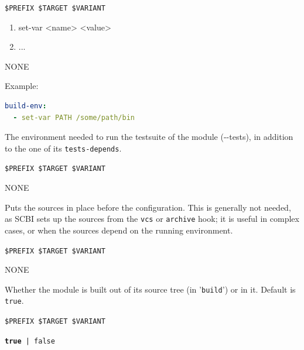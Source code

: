 \documentclass[a4paper,12pt,twoside]{article}
\newcommand{\code}[1]{\texttt{#1}}
\newcommand{\file}[1]{'{\texttt{#1}}'}
\newcommand{\ddash}{-{}-}
\begin{document}
\begin{description}[font=\large\texttt]
	\begin{description}[font=\textit,style=standard]
		\item[parameter] \tabto{2cm} \code{\$PREFIX \$TARGET \$VARIANT}
		\begin{enumerate}
			\item set-var <name> <value>
			\item ...
		\end{enumerate}
		\item[return] \tabto{2cm} NONE
	\end{description}

	Example:
\begin{lstlisting}[language={yaml}]
build-env:
  - set-var PATH /some/path/bin
\end{lstlisting}

	\item[tests-env {[}common|<variant>{]}] The environment needed to run the testsuite of the module (\ddash{}tests), in addition to the one of its \code{tests-depends}.
	\begin{description}[font=\textit,style=standard]
		\item[parameter] \tabto{2cm} \code{\$PREFIX \$TARGET \$VARIANT}
		\item[return] \tabto{2cm} NONE
	\end{description}

	\item[setup {[}<variant>{]}] Puts the sources in place before the configuration. This is generally not needed, as SCBI sets up the sources from the \code{vcs} or \code{archive} hook; it is useful in complex cases, or when the sources depend on the running environment.
	\begin{description}[font=\textit,style=standard]
		\item[parameter] \tabto{2cm} \code{\$PREFIX \$TARGET \$VARIANT}
		\item[return] \tabto{2cm} NONE
	\end{description}

	\item[out-of-tree {[}<variant>{]}] Whether the module is built out of its source tree (in \file{build}) or in it. Default is \code{true}.
	\begin{description}[font=\textit,style=standard]
		\item[parameter] \tabto{2cm} \code{\$PREFIX \$TARGET \$VARIANT}
		\item[return] \tabto{2cm} \code{\textbf{true} | false}
	\end{description}


\end{description}
\end{document}
